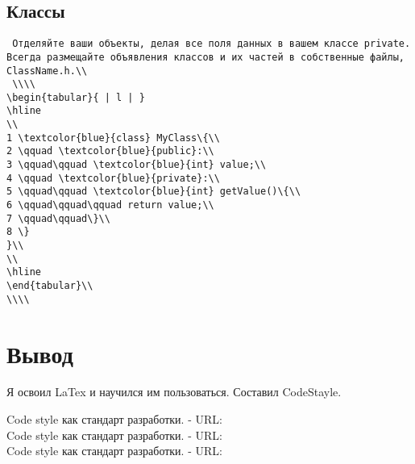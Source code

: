 \documentclass{article}
\begin{document}
\subsection{Классы}
\begin{lstlisting}
 Отделяйте ваши объекты, делая все поля данных в вашем классе private. Всегда размещайте объявления классов и их частей в собственные файлы, ClassName.h.\\
 \\\\
\begin{tabular}{ | l | }
\hline
\\
1 \textcolor{blue}{class} MyClass\{\\
2 \qquad \textcolor{blue}{public}:\\
3 \qquad\qquad \textcolor{blue}{int} value;\\
4 \qquad \textcolor{blue}{private}:\\
5 \qquad\qquad \textcolor{blue}{int} getValue()\{\\
6 \qquad\qquad\qquad return value;\\
7 \qquad\qquad\}\\
8 \} 
}\\
\\
\hline
\end{tabular}\\
\\\\
\end{lstlisting}

\section{Вывод}
Я освоил LaTex и научился им пользоваться. Составил CodeStayle.

\newpage

\begin{thebibliography}{}
Code style как стандарт разработки. - URL:\\           [https://habr.com/ru/company/manychat/blog/468953/]
Code style как стандарт разработки. - URL:\\           [https://tproger.ru/translations/stanford-cpp-style-guide/]
Code style как стандарт разработки. - URL:\\           [https://habr.com/ru/company/ruvds/blog/574352/]
\end{thebibliography}
\end{document}
